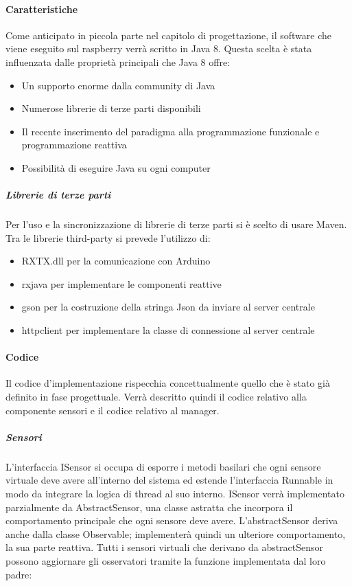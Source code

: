 \documentclass[12pt]{article}
\begin{document}
\paragraph{Caratteristiche}
Come anticipato in piccola parte nel capitolo di progettazione, il software che viene eseguito sul raspberry verrà scritto in Java 8. Questa scelta è stata influenzata dalle proprietà principali che Java 8 offre:
\begin{itemize}
\item Un supporto enorme dalla community di Java
\item Numerose librerie di terze parti disponibili
\item Il recente inserimento del paradigma alla programmazione funzionale e programmazione reattiva
\item Possibilità di eseguire Java su ogni computer
\end{itemize}
\subparagraph{Librerie di terze parti}
Per l'uso e la sincronizzazione di librerie di terze parti si è scelto di usare Maven.
Tra le librerie third-party si prevede l'utilizzo di:
\begin{itemize}
\item RXTX.dll per la comunicazione con Arduino
\item rxjava per implementare le componenti reattive
\item gson per la costruzione della stringa Json da inviare al server centrale
\item httpclient per implementare la classe di connessione al server centrale
\end{itemize}


\paragraph{Codice}
Il codice d'implementazione rispecchia concettualmente quello che è stato già definito in fase progettuale. Verrà descritto quindi il codice relativo alla componente sensori e il codice relativo al manager.
\subparagraph{Sensori}
L'interfaccia ISensor si occupa di esporre i metodi basilari che ogni sensore virtuale deve avere all'interno del sistema ed estende l'interfaccia Runnable in modo da integrare la logica di thread al suo interno. ISensor verrà implementato parzialmente da AbstractSensor, una classe astratta che incorpora il comportamento principale che ogni sensore deve avere.
L'abstractSensor deriva anche dalla classe Observable; implementerà quindi un ulteriore comportamento, la sua parte reattiva. Tutti i sensori virtuali che derivano da abstractSensor possono aggiornare gli osservatori tramite la funzione implementata dal loro padre:
\end{document}
